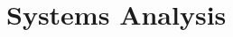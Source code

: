 \documentclass[\main/notes.tex]{subfiles}
\begin{document}
	\setcounter{chapter}{10}
	\chapter{Systems Analysis}
	\vbox{}
\end{document}

